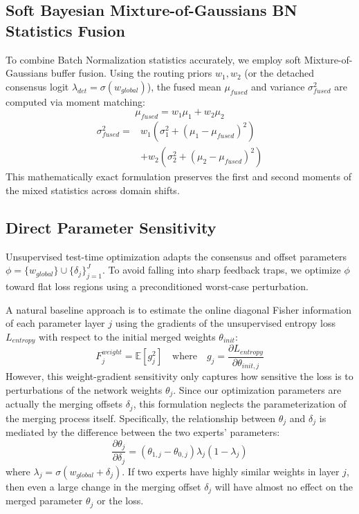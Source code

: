 \documentclass{article}
\theoremstyle{plain}
\theoremstyle{definition}
\theoremstyle{remark}
\begin{document}
\subsection{Soft Bayesian Mixture-of-Gaussians BN Statistics Fusion}
To combine Batch Normalization statistics accurately, we employ soft Mixture-of-Gaussians buffer fusion. Using the routing priors $w_1, w_2$ (or the detached consensus logit $\lambda_{det} = \sigma(w_{global})$), the fused mean $\mu_{fused}$ and variance $\sigma^2_{fused}$ are computed via moment matching:
\begin{equation}
  \mu_{fused} = w_1 \mu_1 + w_2 \mu_2
\end{equation}
\begin{equation}
\begin{split}
  \sigma^2_{fused} = &w_1 \left( \sigma^2_1 + (\mu_1 - \mu_{fused})^2 \right) \\
  &+ w_2 \left( \sigma^2_2 + (\mu_2 - \mu_{fused})^2 \right)
\end{split}
\end{equation}
This mathematically exact formulation preserves the first and second moments of the mixed statistics across domain shifts.

\subsection{Direct Parameter Sensitivity}
Unsupervised test-time optimization adapts the consensus and offset parameters $\phi = \{w_{global}\} \cup \{\delta_j\}_{j=1}^J$. To avoid falling into sharp feedback traps, we optimize $\phi$ toward flat loss regions using a preconditioned worst-case perturbation. 

A natural baseline approach is to estimate the online diagonal Fisher information of each parameter layer $j$ using the gradients of the unsupervised entropy loss $L_{entropy}$ with respect to the initial merged weights $\theta_{init}$:
\begin{equation}
  F^{weight}_j = \mathbb{E} [ g_j^2 ] \quad \text{where} \quad g_j = \frac{\partial L_{entropy}}{\partial \theta_{init, j}}
\end{equation}
However, this weight-gradient sensitivity only captures how sensitive the loss is to perturbations of the network weights $\theta_j$. Since our optimization parameters are actually the merging offsets $\delta_j$, this formulation neglects the parameterization of the merging process itself. Specifically, the relationship between $\theta_j$ and $\delta_j$ is mediated by the difference between the two experts' parameters:
\begin{equation}
  \frac{\partial \theta_j}{\partial \delta_j} = (\theta_{1, j} - \theta_{0, j}) \lambda_j (1 - \lambda_j)
\end{equation}
where $\lambda_j = \sigma(w_{global} + \delta_j)$. If two experts have highly similar weights in layer $j$, then even a large change in the merging offset $\delta_j$ will have almost no effect on the merged parameter $\theta_j$ or the loss.
\end{document}
